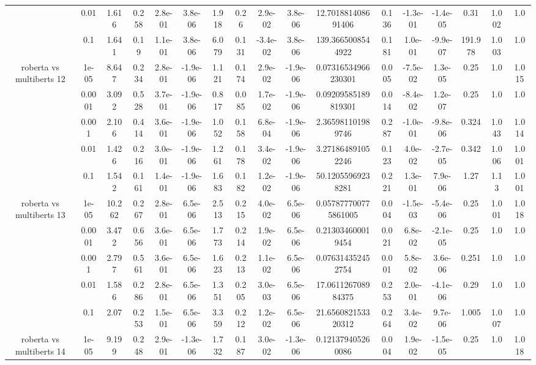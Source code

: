 \begin{tabular}{|c|c|c|c|c|c|c|c|c|c|c|c|c|c|c|c|c|}
 & 0.01 & 1.616 & 0.258 & 2.8e-01 & 3.8e-06 & 1.918 & 0.26 & 2.9e-02 & 3.8e-06 & 12.701881408691406 & 0.136 & -1.3e-01 & -1.4e-05 & 0.31 & 1.002 & 1.0 \\
 & 0.1 & 1.641 & 0.19 & 1.1e-01 & 3.8e-06 & 6.079 & 0.131 & -3.4e-02 & 3.8e-06 & 139.3665008544922 & 0.181 & 1.0e-01 & -9.9e-07 & 191.978 & 1.003 & 1.0 \\
\hline
\multirow{5}{*}{roberta  vs multiberts 12} & 1e-05 & 8.647 & 0.234 & 2.8e-01 & -1.9e-06 & 1.121 & 0.174 & 2.9e-02 & -1.9e-06 & 0.07316534966230301 & 0.005 & -7.5e-02 & 1.3e-05 & 0.25 & 1.0 & 1.015 \\
 & 0.0001 & 3.092 & 0.528 & 3.7e-01 & -1.9e-06 & 0.817 & 0.085 & 1.7e-02 & -1.9e-06 & 0.09209585189819301 & 0.014 & -8.4e-02 & 1.2e-07 & 0.25 & 1.0 & 1.0 \\
 & 0.001 & 2.106 & 0.414 & 3.6e-01 & -1.9e-06 & 1.052 & 0.158 & 6.8e-04 & -1.9e-06 & 2.365981101989746 & 0.287 & -1.0e-01 & -9.8e-06 & 0.324 & 1.043 & 1.014 \\
 & 0.01 & 1.426 & 0.216 & 3.0e-01 & -1.9e-06 & 1.261 & 0.178 & 3.4e-02 & -1.9e-06 & 3.271864891052246 & 0.123 & 4.0e-02 & -2.7e-05 & 0.342 & 1.006 & 1.001 \\
 & 0.1 & 1.542 & 0.161 & 1.4e-01 & -1.9e-06 & 1.683 & 0.182 & 1.2e-02 & -1.9e-06 & 50.12055969238281 & 0.221 & 1.3e-01 & 7.9e-06 & 1.27 & 1.13 & 1.001 \\
\hline
\multirow{5}{*}{roberta  vs multiberts 13} & 1e-05 & 10.262 & 0.267 & 2.8e-01 & 6.5e-06 & 2.513 & 0.215 & 4.0e-02 & 6.5e-06 & 0.057877700775861005 & 0.004 & -1.5e-03 & -5.4e-06 & 0.25 & 1.001 & 1.018 \\
 & 0.0001 & 3.472 & 0.656 & 3.6e-01 & 6.5e-06 & 1.773 & 0.214 & 1.9e-02 & 6.5e-06 & 0.213034600019454 & 0.021 & 6.8e-02 & -2.1e-05 & 0.25 & 1.0 & 1.0 \\
 & 0.001 & 2.797 & 0.561 & 3.6e-01 & 6.5e-06 & 1.623 & 0.213 & 1.1e-02 & 6.5e-06 & 0.076314352452754 & 0.001 & 5.8e-02 & 3.6e-06 & 0.251 & 1.0 & 1.0 \\
 & 0.01 & 1.586 & 0.286 & 2.8e-01 & 6.5e-06 & 1.351 & 0.205 & 3.0e-03 & 6.5e-06 & 17.061126708984375 & 0.253 & 2.0e-01 & -4.1e-06 & 0.29 & 1.0 & 1.0 \\
 & 0.1 & 2.07 & 0.253 & 1.5e-01 & 6.5e-06 & 3.359 & 0.212 & 1.2e-02 & 6.5e-06 & 21.656082153320312 & 0.264 & 3.4e-02 & 9.7e-06 & 1.005 & 1.007 & 1.0 \\
\hline
\multirow{5}{*}{roberta  vs multiberts 14} & 1e-05 & 9.199 & 0.248 & 2.9e-01 & -1.3e-06 & 1.732 & 0.187 & 3.0e-02 & -1.3e-06 & 0.121379405260086 & 0.004 & 1.9e-02 & -1.5e-05 & 0.25 & 1.0 & 1.018 \\

\end{tabular}
